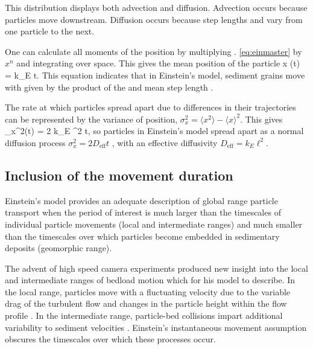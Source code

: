 This distribution displays both advection and diffusion. Advection occurs because particles move downstream. Diffusion occurs because step lengths and \DIFdelbegin {}\DIFdelend \DIFaddbegin {}\DIFaddend vary from one particle to the next.

One can calculate all moments of the position by multiplying \DIFdelbegin {}\DIFdelend \DIFaddbegin {}\DIFaddend . \ref{eq:einmaster} by $x^n$ and integrating over space. This gives the mean position of the particle
\be \langle x (t)  \rangle = k_E \ell t. \ee
This equation indicates that in Einstein's model, sediment grains move with \DIFdelbegin {}\DIFdelend \DIFaddbegin {}\DIFaddend given by the product of the \DIFdelbegin {}\DIFdelend \DIFaddbegin {}\DIFaddend and mean step length \DIFaddbegin \DIFadd{$\ell$}\DIFaddend .

The rate at which particles spread apart due to differences in their trajectories can be represented by the variance of position, $\sigma_x^2  = \langle x^2 \rangle - \langle x \rangle^2$. This gives
\be \sigma_x^2(t) = 2 k_E \ell^2 t, \ee
so particles in Einstein's model spread apart as a normal diffusion process $\sigma_x^2 = 2 D_\text{eff} t$ \citep{Sokolov2012}, with an effective diffusivity $D_\text{eff} = k_E \ell^2.$

\subsection{Inclusion of the movement duration}
\label{sec:lisle}

Einstein's model provides an adequate description of global range particle transport when the period of interest is much larger than the timescales of individual particle movements (local and intermediate ranges) and much smaller than the timescales over which particles become embedded in sedimentary deposits (geomorphic range).

The advent of high speed camera experiments produced new insight into the local and intermediate ranges of bedload motion \citep{Abbott1977,Francis1973,Drake1988} which \citet{Einstein1937} \DIFdelbegin {}\DIFdelend \DIFaddbegin {}\DIFaddend for his model to describe.
In the local range, particles move with a fluctuating velocity due to the variable drag of the turbulent flow \citep{Lajeunesse2010,Fathel2015} and changes in the particle \DIFdelbegin {}\DIFdelend height within the flow profile \citep{VanRijn1984,Wiberg1985}.
In the intermediate range, particle-bed collisions impart additional variability to sediment velocities \citep{Gordon1972,Martin2013}.
Einstein's instantaneous movement assumption obscures the timescales over which these processes occur.

